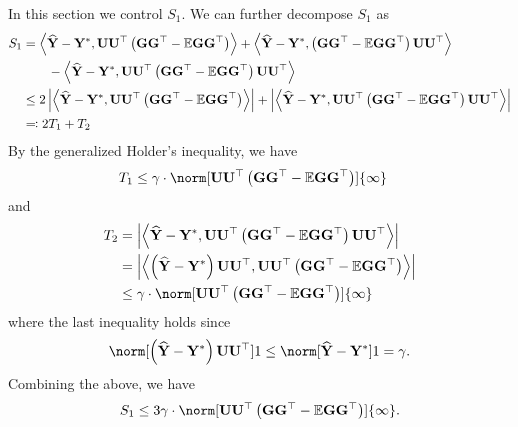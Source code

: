 In this section we control $S_{1}$. We can further decompose $S_{1}$
as 
\begin{align*}
S_{1} & =\left\langle \Yhat-\Ystar,\U\U\t\left(\G\G\t-\E\G\G\t\right)\right\rangle +\left\langle \Yhat-\Ystar,\left(\G\G\t-\E\G\G\t\right)\U\U\t\right\rangle \\
 & \qquad-\left\langle \Yhat-\Ystar,\U\U\t\left(\G\G\t-\E\G\G\t\right)\U\U\t\right\rangle \\
 & \leq2\left|\left\langle \Yhat-\Ystar,\U\U\t\left(\G\G\t-\E\G\G\t\right)\right\rangle \right|+\left|\left\langle \Yhat-\Ystar,\U\U\t\left(\G\G\t-\E\G\G\t\right)\U\U\t\right\rangle \right|\\
 & \eqqcolon2T_{1}+T_{2}
\end{align*}
By the generalized Holder's inequality, we have 
\begin{align*}
T_{1} & \leq\error\cdot\norm[\U\U\t\left(\G\G\t-\E\G\G\t\right)]{\infty}
\end{align*}
and 
\begin{align*}
T_{2} & =\left|\left\langle \Yhat-\Ystar,\U\U\t\left(\G\G\t-\E\G\G\t\right)\U\U\t\right\rangle \right|\\
 & =\left|\left\langle \left(\Yhat-\Ystar\right)\U\U\t,\U\U\t\left(\G\G\t-\E\G\G\t\right)\right\rangle \right|\\
 & \leq\error\cdot\norm[\U\U\t\left(\G\G\t-\E\G\G\t\right)]{\infty}
\end{align*}
where the last inequality holds since 
\[
\norm[\left(\Yhat-\Ystar\right)\U\U\t]1\leq\norm[\Yhat-\Ystar]1=\error.
\]
Combining the above, we have 
\[
S_{1}\leq3\error\cdot\norm[\U\U\t\left(\G\G\t-\E\G\G\t\right)]{\infty}.
\]

